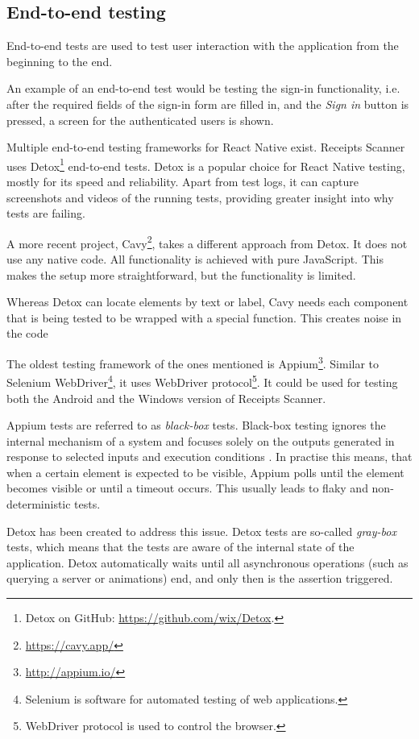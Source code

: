 \documentclass[
  digital, %
  table,   %
  oneside, %
  lof,     %
  lot,     %
]{fithesis3}
\begin{document}
\subsection{End-to-end testing}
\label{sec:end_to_end_testing}
End-to-end tests are used to test user interaction with the application from the beginning to the end. 

An example of an end-to-end test would be testing the sign-in functionality, i.e. after the required fields of the sign-in form are filled in, and the \textit{Sign in} button is pressed, a screen for the authenticated users is shown.

Multiple end-to-end testing frameworks for React Native exist. Receipts Scanner uses Detox\footnote{Detox on GitHub: \url{https://github.com/wix/Detox}.} end-to-end tests. Detox is a popular choice for React Native testing, mostly for its speed and reliability. Apart from test logs, it can capture screenshots and videos of the running tests, providing greater insight into why tests are failing.

A more recent project, Cavy\footnote{\url{https://cavy.app/}}, takes a different approach from Detox. It does not use any native code. All functionality is achieved with pure JavaScript. This makes the setup more straightforward, but the functionality is limited.

Whereas Detox can locate elements by text or label, Cavy needs each component that is being tested to be wrapped with a special function. This creates noise in the code

The oldest testing framework of the ones mentioned is Appium\footnote{\url{http://appium.io/}}. Similar to Selenium WebDriver\footnote{Selenium is software for automated testing of web applications.}, it uses WebDriver protocol\footnote{WebDriver protocol is used to control the browser.}. It could be used for testing both the Android and the Windows version of Receipts Scanner.

Appium tests are referred to as \textit{black-box} tests. Black-box testing ignores the internal mechanism of a system and focuses solely on the outputs generated in response to selected inputs and execution conditions \cite{Gao2003Testing}. In practise this means, that when a certain element is expected to be visible, Appium polls until the element becomes visible or until a timeout occurs. This usually leads to flaky and non-deterministic tests.

Detox has been created to address this issue. Detox tests are so-called \textit{gray-box} tests, which means that the tests are aware of the internal state of the application. Detox automatically waits until all asynchronous operations (such as querying a server or animations) end, and only then is the assertion triggered.
\end{document}
